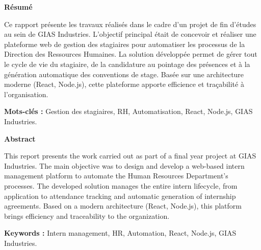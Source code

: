 \begin{center}
\textbf{Résumé}
\end{center}

Ce rapport présente les travaux réalisés dans le cadre d'un projet de fin d'études au sein de GIAS Industries. L'objectif principal était de concevoir et réaliser une plateforme web de gestion des stagiaires pour automatiser les processus de la Direction des Ressources Humaines. La solution développée permet de gérer tout le cycle de vie du stagiaire, de la candidature au pointage des présences et à la génération automatique des conventions de stage. Basée sur une architecture moderne (React, Node.js), cette plateforme apporte efficience et traçabilité à l'organisation.

\textbf{Mots-clés :} Gestion des stagiaires, RH, Automatisation, React, Node.js, GIAS Industries.

\vspace{1cm}

\begin{center}
\textbf{Abstract}
\end{center}

This report presents the work carried out as part of a final year project at GIAS Industries. The main objective was to design and develop a web-based intern management platform to automate the Human Resources Department's processes. The developed solution manages the entire intern lifecycle, from application to attendance tracking and automatic generation of internship agreements. Based on a modern architecture (React, Node.js), this platform brings efficiency and traceability to the organization.

\textbf{Keywords :} Intern management, HR, Automation, React, Node.js, GIAS Industries.